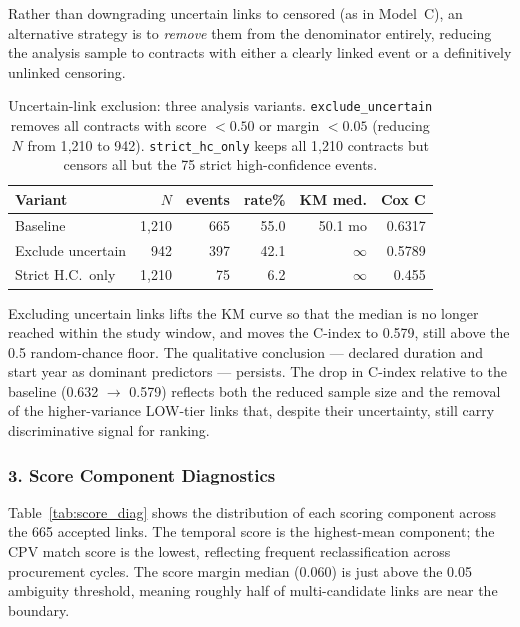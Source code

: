 \documentclass[12pt, a4paper]{article}
\begin{document}
Rather than downgrading uncertain links to censored (as in Model~C), an
alternative strategy is to \emph{remove} them from the denominator entirely,
reducing the analysis sample to contracts with either a clearly linked event or
a definitively unlinked censoring.

\begin{table}[H]
\centering
\caption{Uncertain-link exclusion: three analysis variants. \texttt{exclude\_uncertain}
removes all contracts with score $< 0.50$ or margin $< 0.05$ (reducing
$N$ from 1{,}210 to 942). \texttt{strict\_hc\_only} keeps all 1{,}210
contracts but censors all but the 75 strict high-confidence events.}
\label{tab:exclusion}
\small
\begin{tabular}{@{}lrrrrr@{}}
\toprule
\textbf{Variant} & \textbf{$N$} & \textbf{events} & \textbf{rate\%} &
\textbf{KM med.} & \textbf{Cox C} \\
\midrule
Baseline               & 1{,}210 & 665 & 55.0 & 50.1 mo & 0.6317 \\
Exclude uncertain      &   942   & 397 & 42.1 & $\infty$ & 0.5789 \\
Strict H.C.\ only      & 1{,}210 &  75 &  6.2 & $\infty$ & 0.455 \\
\bottomrule
\end{tabular}
\end{table}

Excluding uncertain links lifts the KM curve so that the median is no longer
reached within the study window, and moves the C-index to 0.579, still above
the 0.5 random-chance floor. The qualitative conclusion --- declared duration
and start year as dominant predictors --- persists. The drop in C-index
relative to the baseline (0.632 $\to$ 0.579) reflects both the reduced sample
size and the removal of the higher-variance LOW-tier links that, despite their
uncertainty, still carry discriminative signal for ranking.

\subsubsection*{3. Score Component Diagnostics}

Table~\ref{tab:score_diag} shows the distribution of each scoring component
across the 665 accepted links. The temporal score is the highest-mean component;
the CPV match score is the lowest, reflecting frequent reclassification across
procurement cycles. The score margin median (0.060) is just above the 0.05
ambiguity threshold, meaning roughly half of multi-candidate links are near the
boundary.
\end{document}
